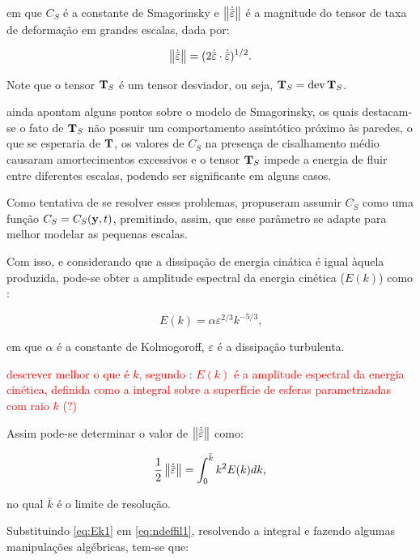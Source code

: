 \documentclass[_ArquivoPrincipal.tex]{subfiles}
\begin{document}
\noindent em que $C_S$ é a constante de Smagorinsky e $\left\lVert{\dot{\bar{\mathbf{\varepsilon}}}}\right\lVert$ é a magnitude do tensor de taxa de deformação em grandes escalas, dada por:

\begin{equation}
    \left\lVert{\dot{\bar{\mathbf{\varepsilon}}}}\right\lVert=(2\dot{\bar{\mathbf{\varepsilon}}}\cdot\dot{\bar{\mathbf{\varepsilon}}})^{1/2}\text{.}
\end{equation}

Note que o tensor $\mathbf{T}_S$ é um tensor desviador, ou seja, $\mathbf{T}_S=\mathop{\mathrm{dev}}\nolimits{\mathbf{T}_S}$.

 ainda apontam alguns pontos sobre o modelo de Smagorinsky, os quais destacam-se o fato de $\mathbf{T}_S$ não possuir um comportamento assintótico próximo às paredes, o que se esperaria de $\mathbf{T}$, os valores de $C_S$ na presença de cisalhamento médio causaram amortecimentos excessivos e o tensor $\mathbf{T}_S$ impede a energia de fluir entre diferentes escalas, podendo ser significante em alguns casos.

Como tentativa de se resolver esses problemas,  propuseram assumir $C_S$ como uma função $C_S=C_S(\mathbf{y},t)$, premitindo, assim, que esse parâmetro se adapte para melhor modelar as pequenas escalas.

Com isso, e considerando que a dissipação de energia cinática é igual àquela produzida, pode-se obter a amplitude espectral da energia cinética ($E(k)$) como \cite{hughes2000large}:

\begin{equation}
    E(k)=\alpha\varepsilon^{2/3}k^{-5/3}\text{,}\label{eq:Ek1}
\end{equation}

\noindent em que $\alpha$ é a constante de Kolmogoroff, $\varepsilon$ é a dissipação turbulenta.

\textcolor{red}{descrever melhor o que é $k$, segundo : $E(k)$ é a amplitude espectral da energia cinética, definida como a integral sobre a superfície de esferas parametrizadas com raio $k$ (?)}

Assim pode-se determinar o valor de $\left\lVert{\dot{\bar{\mathbf{\varepsilon}}}}\right\lVert$ como:

\begin{equation}
    \frac{1}{2}\left\lVert{\dot{\bar{\mathbf{\varepsilon}}}}\right\lVert=\int_0^{\bar{k}}{k^2E(k)dk}\text{,}\label{eq:ndeffil1}
\end{equation}

\noindent no qual $\bar{k}$ é o limite de resolução.

Substituindo \ref{eq:Ek1} em \ref{eq:ndeffil1}, resolvendo a integral e fazendo algumas manipulações algébricas, tem-se que:
\end{document}
